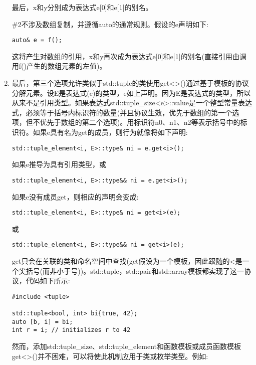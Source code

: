 \begin{enumerate}
最后，x和y分别成为表达式e[0]和e[1]的别名。

\#2不涉及数组复制，并遵循auto的通常规则。假设的e声明如下:

\begin{lstlisting}[style=styleCXX]
auto& e = f();
\end{lstlisting}

这将产生对数组的引用，x和y再次成为表达式e[0]和e[1]的别名(直接引用由调用f()产生的数组元素的左值)。

\item
最后，第三个选项允许类似于std::tuple的类使用get<>()通过基于模板的协议分解元素。设E是表达式(e)的类型，e如上声明。因为E是表达式的类型，所以从来不是引用类型。如果表达式std::tuple\_size<e>::value是一个整型常量表达式，必须等于括号内标识符的数量(并且协议生效，优先于数组的第一个选项，但不优先于数组的第二个选项)。用标识符n0、n1、n2等表示括号中的标识符。如果e具有名为get的成员，则行为就像将如下声明:

\begin{lstlisting}[style=styleCXX]
std::tuple_element<i, E>::type& ni = e.get<i>();
\end{lstlisting}

如果e推导为具有引用类型，或

\begin{lstlisting}[style=styleCXX]
std::tuple_element<i, E>::type&& ni = e.get<i>();
\end{lstlisting}

如果e没有成员get，则相应的声明会变成:

\begin{lstlisting}[style=styleCXX]
std::tuple_element<i, E>::type& ni = get<i>(e);
\end{lstlisting}

或

\begin{lstlisting}[style=styleCXX]
std::tuple_element<i, E>::type&& ni = get<i>(e);
\end{lstlisting}

get只会在关联的类和命名空间中查找(get假设为一个模板，因此跟随的<是一个尖括号(而非小于号))。std::tuple，std::pair和std::array模板都实现了这一协议，代码如下所示:

\begin{lstlisting}[style=styleCXX]
#include <tuple>

std::tuple<bool, int> bi{true, 42};
auto [b, i] = bi;
int r = i; // initializes r to 42
\end{lstlisting}

然而，添加std::tuple\_size、std::tuple\_element和函数模板或成员函数模板get<>()并不困难，可以将使此机制应用于类或枚举类型。例如:


\end{enumerate}

